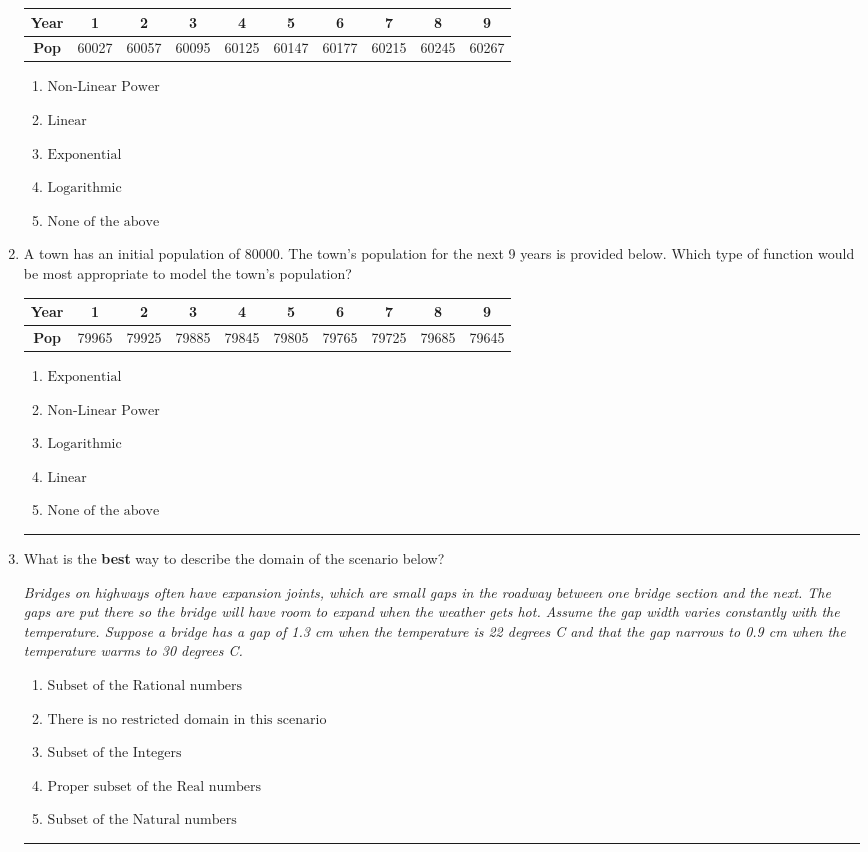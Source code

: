 \documentclass[14pt]{extbook}
\newcommand{\litem}[1]{\item#1\hspace*{-1cm}\rule{\textwidth}{0.4pt}}
\begin{document}
\begin{enumerate}
{\begin{tabular}{c|c|c|c|c|c|c|c|c|c}
\textbf{Year} &1 &2 &3 &4 &5 &6 &7 &8 &9\tabularnewline \hline
\textbf{Pop} &60027 &60057 &60095 &60125 &60147 &60177 &60215 &60245 &60267\end{tabular}\begin{enumerate}[label=\Alph*.]
\item \( \text{Non-Linear Power} \)
\item \( \text{Linear} \)
\item \( \text{Exponential} \)
\item \( \text{Logarithmic} \)
\item \( \text{None of the above} \)

\end{enumerate} }
\litem{
A town has an initial population of 80000. The town's population for the next 9 years is provided below. Which type of function would be most appropriate to model the town's population?

\begin{tabular}{c|c|c|c|c|c|c|c|c|c}
\textbf{Year} &1 &2 &3 &4 &5 &6 &7 &8 &9\tabularnewline \hline
\textbf{Pop} &79965 &79925 &79885 &79845 &79805 &79765 &79725 &79685 &79645\end{tabular}\begin{enumerate}[label=\Alph*.]
\item \( \text{Exponential} \)
\item \( \text{Non-Linear Power} \)
\item \( \text{Logarithmic} \)
\item \( \text{Linear} \)
\item \( \text{None of the above} \)

\end{enumerate} }
\litem{
What is the \textbf{best} way to describe the domain of the scenario below?
\begin{center}
    \textit{ Bridges on highways often have expansion joints, which are small gaps in the roadway between one bridge section and the next. The gaps are put there so the bridge will have room to expand when the weather gets hot. Assume the gap width varies constantly with the temperature. Suppose a bridge has a gap of 1.3 cm when the temperature is 22 degrees C and that the gap narrows to 0.9 cm when the temperature warms to 30 degrees C. }
\end{center}
\begin{enumerate}[label=\Alph*.]
\item \( \text{Subset of the Rational numbers} \)
\item \( \text{There is no restricted domain in this scenario} \)
\item \( \text{Subset of the Integers} \)
\item \( \text{Proper subset of the Real numbers} \)
\item \( \text{Subset of the Natural numbers} \)


\end{enumerate}}
\end{enumerate}
\end{document}
